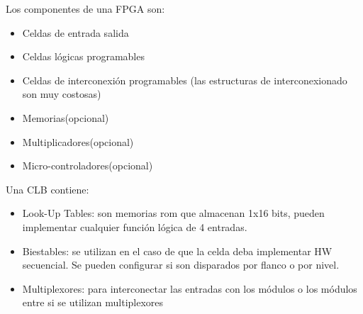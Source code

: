 Los componentes de una FPGA son:
\begin{itemize}
	\item Celdas de entrada salida
	\item Celdas lógicas programables
	\item Celdas de interconexión programables (las estructuras de interconexionado son muy costosas)
	\item Memorias(opcional)
	\item Multiplicadores(opcional)
	\item Micro-controladores(opcional)
\end{itemize}

Una CLB contiene:
\begin{itemize}
	\item Look-Up Tables: son memorias \gls{rom} que almacenan 1x16 bits, pueden implementar cualquier función lógica de 4 entradas.
	\item Biestables: se utilizan en el caso de que la celda deba implementar HW secuencial. Se pueden configurar si son disparados por flanco o por nivel.
	\item Multiplexores: para interconectar las entradas con los módulos o los módulos entre si se utilizan multiplexores
\end{itemize}
